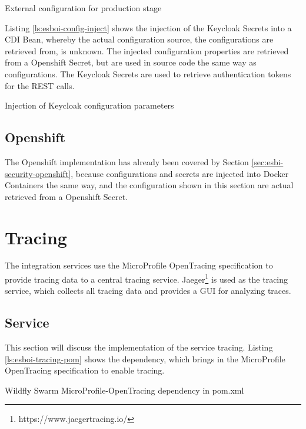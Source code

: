 \begin{listing}
	\caption{External configuration for production stage}
	\label{ls:esboi-config-project-stages-prod}
\end{listing}

Listing \vref{ls:esboi-config-inject} shows the injection of the Keycloak Secrets into a CDI Bean, whereby the actual configuration source, the configurations are retrieved from, is unknown. The injected configuration properties are retrieved from a Openshift Secret, but are used in source code the same way as configurations. The Keycloak Secrets are used to retrieve authentication tokens for the REST calls. 

\begin{listing}
	\caption{Injection of Keycloak configuration parameters}
	\label{ls:esboi-config-inject}
\end{listing}

\subsection{Openshift}
\label{sec:esbi-config-openshift}
The Openshift implementation has already been covered by Section \vref{sec:esbi-security-openshift}, because configurations and secrets are injected into Docker Containers the same way, and the configuration shown in this section are actual retrieved from a Openshift Secret. 

\section{Tracing}
\label{sec:esbi-tracing}
The integration services use the MicroProfile OpenTracing specification to provide tracing data to a central tracing service. Jaeger\footnote{https://www.jaegertracing.io/} is used as the tracing service, which collects all tracing data and provides a GUI for analyzing traces. 

\subsection{Service}
\label{sec:esbi-tracing-service}
This section will discuss the implementation of the service tracing. Listing \vref{ls:esboi-tracing-pom} shows the dependency, which brings in the MicroProfile OpenTracing specification to enable tracing. 

\begin{listing}
	\caption{Wildfly Swarm MicroProfile-OpenTracing dependency in pom.xml}
	\label{ls:esboi-tracing-pom}
\end{listing}

